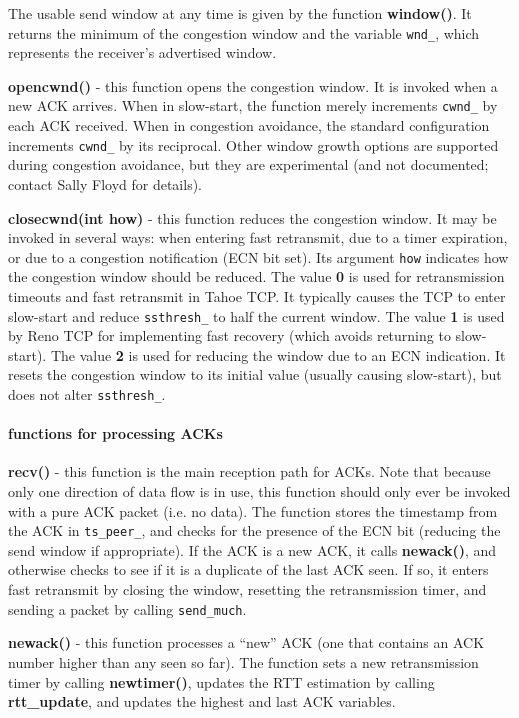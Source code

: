 \documentclass{article}
\begin{document}
The usable send window at any time is given by the function {\bf window()}.
It returns the minimum of the congestion window and the variable {\tt wnd\_},
which represents the receiver's advertised window.

{\bf opencwnd()} - this function opens the congestion window.  It is invoked
when a new ACK arrives.
When in slow-start, the function merely increments {\tt cwnd\_} by each
ACK received.
When in congestion avoidance, the standard configuration increments {\tt cwnd\_}
by its reciprocal.
Other window growth options are supported during congestion avoidance,
but they are experimental (and not documented; contact Sally Floyd for
details).

{\bf closecwnd(int how)} - this function reduces the congestion window. It
may be invoked in several ways: when entering fast retransmit, due to
a timer expiration, or due to a congestion notification (ECN bit set).
Its argument {\tt how} indicates how the congestion window should
be reduced.  The value {\bf 0} is used for retransmission timeouts and
fast retransmit in Tahoe TCP.  It typically causes the TCP to enter
slow-start and reduce {\tt ssthresh\_} to half the current window.
The value {\bf 1} is used by Reno TCP for implementing fast recovery
(which avoids returning to slow-start).
The value {\bf 2} is used for reducing the window due to an ECN indication.
It resets the congestion window to its initial value (usually causing
slow-start), but does not alter {\tt ssthresh\_}.

\paragraph{functions for processing ACKs}

{\bf recv()} - this function is the main reception path for ACKs.
Note that because only one direction of data flow is in use, this function
should only ever be invoked with a pure ACK packet (i.e. no data).
The function stores the timestamp from the ACK in {\tt ts\_peer\_}, and
checks for the presence of the ECN bit (reducing the send window if
appropriate).
If the ACK is a new ACK, it calls {\bf newack()}, and otherwise
checks to see if it is a duplicate of the last ACK seen.
If so, it enters fast retransmit by closing the window, resetting the
retransmission timer, and sending a packet by calling {\tt send\_much}.

{\bf newack()} - this function processes a ``new'' ACK (one that contains
an ACK number higher than any seen so far).
The function sets a new retransmission timer by calling {\bf newtimer()},
updates the RTT estimation by calling {\bf rtt\_update}, and updates
the highest and last ACK variables.
\end{document}
